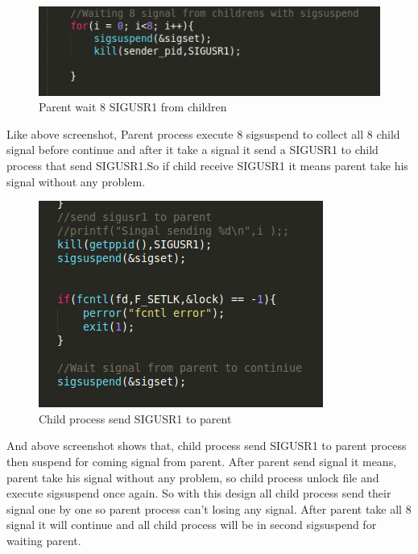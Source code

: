 \documentclass{article}
\begin{document}
\begin{figure}[h!]
\centering
\includegraphics[scale=0.5]{ss4.png}
\caption{Parent wait 8 SIGUSR1 from children}
\label{fig:ss4.png}
\end{figure}
Like above screenshot, Parent process execute 8 sigsuspend to collect all 8 child signal before continue and after it take a signal it send a SIGUSR1 to child process that send SIGUSR1.So if child receive SIGUSR1 it means parent take his signal without any problem.
\begin{figure}[h!]
\centering
\includegraphics[scale=0.6]{ss5.png}
\caption{Child process send SIGUSR1 to parent}
\label{fig:ss5.png}
\end{figure}

And above screenshot shows that, child process send SIGUSR1 to parent process then suspend for coming signal from parent. After parent send signal it means, parent take his signal without any problem, so child process unlock file and execute sigsuspend once again. So with this design all child process send their signal one by one so parent process can't losing any signal. After parent take all 8 signal it will continue and all child process will be in second sigsuspend for waiting parent.
\end{document}
